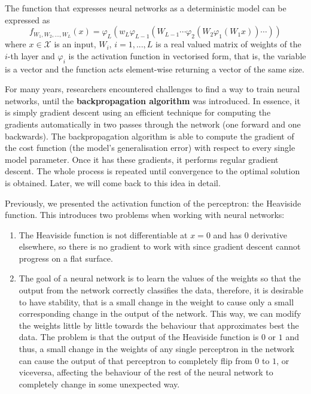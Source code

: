 The function that expresses neural networks as a deterministic model can be expressed as 
\begin{equation}
    f_{W_1, W_2,..., W_L}(x) = \varphi_L(w_L \varphi_{L-1}(W_{L-1} \cdots \varphi_2(W_2 \varphi_1(W_1 x) ) \cdots ) )
\end{equation}
where $x \in\mathcal{X}$ is an input, $W_i, \, i=1,...,L$ is a real valued matrix of weights of the $i$-th layer and $\varphi_i$ is the activation function in vectorised form, that is, the variable is a vector and the function acts element-wise returning a vector of the same size. 

For many years, researchers encountered challenges to find a way to train neural networks, until the \textbf{backpropagation algorithm} was introduced. In essence, it is simply gradient descent using an efficient technique for computing the gradients automatically in two passes through the network (one forward and one backwards). The backpropagation algorithm is able to compute the gradient of the cost function (the model's generalisation error) with respect to every single model parameter. Once it has these gradients, it performs regular gradient descent. The whole process is repeated until convergence to the optimal solution is obtained. Later, we will come back to this idea in detail.

Previously, we presented the activation function of the perceptron: the Heaviside function. This introduces two problems when working with neural networks:
\begin{enumerate}
    \item The Heaviside function is not differentiable at $x=0$ and has $0$ derivative elsewhere, so there is no gradient to work with since gradient descent cannot progress on a flat surface. 

    \item The goal of a neural network is to learn the values of the weights so that the output from the network correctly classifies the data, therefore, it is desirable to have stability, that is a small change in the weight to cause only a small corresponding change in the output of the network. This way, we can modify the weights little by little towards the behaviour that approximates best the data. The problem is that the output of the Heaviside function is $0$ or $1$ and thus, a small change in the weights of any single perceptron in the network can cause the output of that perceptron to completely flip from $0$ to $1$, or viceversa, affecting the behaviour of the rest of the neural network to completely change in some unexpected way.
\end{enumerate}

